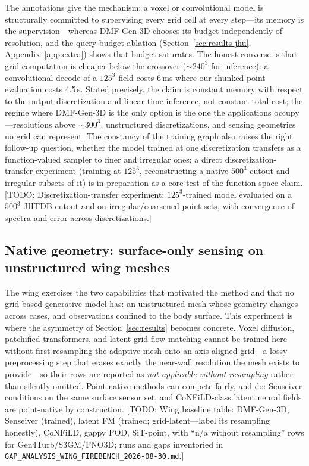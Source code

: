 \documentclass{article} %
\newcommand{\todo}[1]{{\color{red}[TODO: #1]}}
\newcommand{\model}{DMF-Gen-3D}
\begin{document}
The annotations give the mechanism: a voxel or convolutional model is structurally committed to supervising every grid cell at every step---its memory is the supervision---whereas \model{} chooses its budget independently of resolution, and the query-budget ablation (Section~\ref{sec:results-jhu}, Appendix~\ref{app:extra}) shows that budget saturates. The honest converse is that grid computation is cheaper below the crossover ($\sim$$240^3$ for inference): a convolutional decode of a $125^3$ field costs 6\,ms where our chunked point evaluation costs 4.5\,s. Stated precisely, the claim is constant memory with respect to the output discretization and linear-time inference, not constant total cost; the regime where \model{} is the only option is the one the applications occupy---resolutions above $\sim$$300^3$, unstructured discretizations, and sensing geometries no grid can represent. The constancy of the training graph also raises the right follow-up question, whether the model trained at one discretization transfers as a function-valued sampler to finer and irregular ones; a direct discretization-transfer experiment (training at $125^3$, reconstructing a native $500^3$ cutout and irregular subsets of it) is in preparation as a core test of the function-space claim. \todo{Discretization-transfer experiment: $125^3$-trained model evaluated on a $500^3$ JHTDB cutout and on irregular/coarsened point sets, with convergence of spectra and error across discretizations.}

\subsection{Native geometry: surface-only sensing on unstructured wing meshes}
\label{sec:results-wing}
The wing exercises the two capabilities that motivated the method and that no grid-based generative model has: an unstructured mesh whose geometry changes across cases, and observations confined to the body surface. This experiment is where the asymmetry of Section~\ref{sec:results} becomes concrete. Voxel diffusion, patchified transformers, and latent-grid flow matching cannot be trained here without first resampling the adaptive mesh onto an axis-aligned grid---a lossy preprocessing step that erases exactly the near-wall resolution the mesh exists to provide---so their rows are reported as \emph{not applicable without resampling} rather than silently omitted. Point-native methods can compete fairly, and do: Senseiver conditions on the same surface sensor set, and CoNFiLD-class latent neural fields are point-native by construction. \todo{Wing baseline table: \model{}, Senseiver (trained), latent FM (trained; grid-latent---label its resampling honestly), CoNFiLD, gappy POD, SiT-point, with ``n/a without resampling'' rows for Gen4Turb/S3GM/FNO3D; runs and gaps inventoried in \texttt{GAP\_ANALYSIS\_WING\_FIREBENCH\_2026-08-30.md}.}
\end{document}
